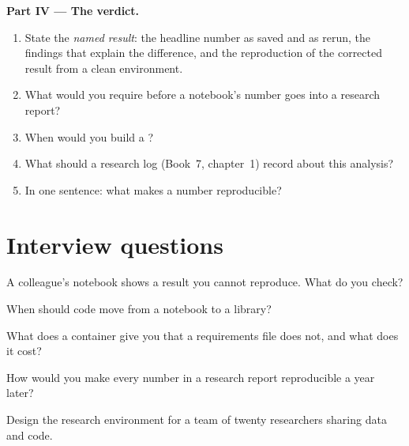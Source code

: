 \begin{problem}
\medskip\noindent\textbf{Part IV --- The verdict.}
\begin{enumerate}[resume]
\item State the \emph{named result}: the headline number as saved and as rerun, the findings that explain the difference, and the reproduction
of the corrected result from a clean environment.
\item What would you require before a notebook's number goes into a research report?
\item When would you build a ?
\item What should a research log (Book~7, chapter~1) record about this analysis?
\item In one sentence: what makes a number reproducible?
\end{enumerate}
\end{problem}

\section{Interview questions}

\begin{interviewq}\label{iq:pl:the-research-environment:1}
A colleague's notebook shows a result you cannot reproduce. What do you check?
\end{interviewq}

\begin{interviewq}\label{iq:pl:the-research-environment:2}
When should code move from a notebook to a library?
\end{interviewq}

\begin{interviewq}\label{iq:pl:the-research-environment:3}
What does a container give you that a requirements file does not, and what does it cost?
\end{interviewq}

\begin{interviewq}\label{iq:pl:the-research-environment:4}
How would you make every number in a research report reproducible a year later?
\end{interviewq}

\begin{interviewq}\label{iq:pl:the-research-environment:5}
Design the research environment for a team of twenty researchers sharing data and code.
\end{interviewq}
